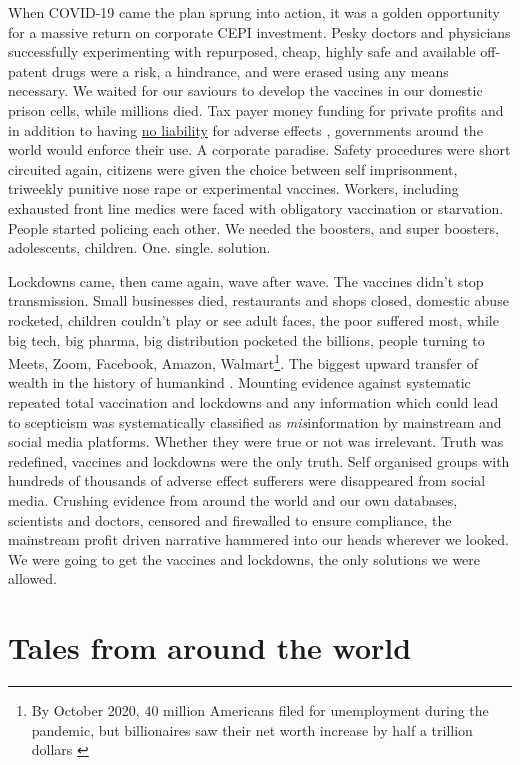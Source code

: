 \documentclass[11pt,a4paper,notitlepage]{report}
\begin{document}
When COVID-19 came the plan sprung into action, it was a golden opportunity for a massive return on corporate CEPI investment. Pesky doctors and physicians successfully experimenting with repurposed, cheap, highly safe and available off-patent drugs were a risk, a hindrance, and were erased using any means necessary. We waited for our saviours to develop the vaccines in our domestic prison cells, while millions died. Tax payer money funding for private profits and in addition to having \href{https://www.cnbc.com/2020/12/16/covid-vaccine-side-effects-compensation-lawsuit.html}{no liability} for adverse effects \cite{cnbc17122020}, governments around the world would enforce their use. A corporate paradise. Safety procedures were short circuited again, citizens were given the choice between self imprisonment, triweekly punitive nose rape or experimental vaccines. Workers, including exhausted front line medics were faced with obligatory vaccination or starvation. People started policing each other. We needed the boosters, and super boosters, adolescents, children. One. single. solution.

Lockdowns came, then came again, wave after wave. The vaccines didn't stop transmission. Small businesses died, restaurants and shops closed, domestic abuse rocketed, children couldn't play or see adult faces, the poor suffered most, while big tech, big pharma, big distribution pocketed the billions, people turning to Meets, Zoom, Facebook, Amazon, Walmart\footnote{By October 2020, 40 million Americans filed for unemployment during the pandemic, but billionaires saw their net worth increase by half a trillion dollars \cite{businessinsider30102020}}. The biggest upward transfer of wealth in the history of humankind \cite{oxfam17012022}. Mounting evidence against systematic repeated total vaccination and lockdowns and any information which could lead to scepticism was systematically classified as \textit{mis}information by mainstream and social media platforms. Whether they were true or not was irrelevant. Truth was redefined, vaccines and lockdowns were the only truth. Self organised groups with hundreds of thousands of adverse effect sufferers were disappeared from social media. Crushing evidence from around the world and our own databases, scientists and doctors, censored and firewalled to ensure compliance, the mainstream profit driven narrative hammered into our heads wherever we looked. We were going to get the vaccines and lockdowns, the only solutions we were allowed.

\section*{Tales from around the world}
\end{document}
